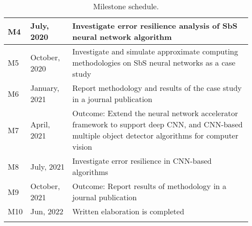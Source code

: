 \begin{longtable}{|l|l|m{9cm}|}
		M4                 & July, 2020      & Investigate error resilience analysis of SbS neural network algorithm                                                                                                                                                                                                                                                                           \\ \hline
		M5                 & October, 2020   & Investigate and simulate approximate computing methodologies on SbS neural networks as a case study                                                                                                                                                                                                                             \\ \hline
		M6                 & January, 2021   & Report methodology and results of the case study in a journal publication
		\\ \hline
		M7                 & April, 2021     & Outcome: Extend the neural network accelerator framework to support deep CNN, and CNN-based multiple object detector algorithms for computer vision                                                                                                                                                                                                                                                                                                                       \\ \hline
		M8                 & July, 2021      & Investigate error resilience in CNN-based algorithms                                                                                                                                                                                                                                                                                                                                        \\ \hline
		M9                 & October, 2021   & Outcome: Report results of methodology in a journal publication                                                                                                                                                                                                                                                                                                                                                                                          \\ \hline
		M10                & Jun, 2022       & Written elaboration is completed                                                                                                                                                                                                                                                                                                                                                                                                                                                    \\ \hline
		\caption{Milestone schedule.}\label{tab:mileston_schedule}
	\end{longtable}
